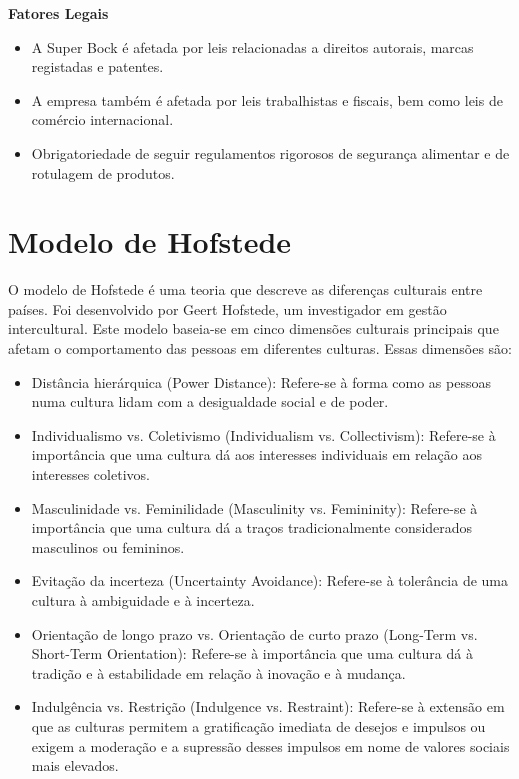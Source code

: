 \noindent \textbf{Fatores Legais} %
\begin{itemize}
    \item A Super Bock é afetada por leis relacionadas a direitos autorais, marcas registadas e patentes.
    \item A empresa também é afetada por leis trabalhistas e fiscais, bem como leis de comércio internacional\cite{ref7}.
    \item Obrigatoriedade de seguir regulamentos rigorosos de segurança alimentar e de rotulagem de produtos\cite{ref7}.
\end{itemize}

\section{Modelo de Hofstede}
O modelo de Hofstede é uma teoria que descreve as diferenças culturais entre países. Foi desenvolvido por Geert Hofstede, um investigador em gestão intercultural. Este modelo baseia-se em cinco dimensões culturais principais que afetam o comportamento das pessoas em diferentes culturas. Essas dimensões são:

\noindent \textbf{}
\begin{itemize}
    
\item Distância hierárquica (Power Distance): Refere-se à forma como as pessoas numa cultura lidam com a desigualdade social e de poder.
\item Individualismo vs. Coletivismo (Individualism vs. Collectivism): Refere-se à importância que uma cultura dá aos interesses individuais em relação aos interesses coletivos.

\item Masculinidade vs. Feminilidade (Masculinity vs. Femininity): Refere-se à importância que uma cultura dá a traços tradicionalmente considerados masculinos ou femininos.


\item Evitação da incerteza (Uncertainty Avoidance): Refere-se à tolerância de uma cultura à ambiguidade e à incerteza.


\item Orientação de longo prazo vs. Orientação de curto prazo (Long-Term vs. Short-Term Orientation): Refere-se à importância que uma cultura dá à tradição e à estabilidade em relação à inovação e à mudança.

\item Indulgência vs. Restrição (Indulgence vs. Restraint): Refere-se à extensão em que as culturas permitem a gratificação imediata de desejos e impulsos ou exigem a moderação e a supressão desses impulsos em nome de valores sociais mais elevados.

\end{itemize}

